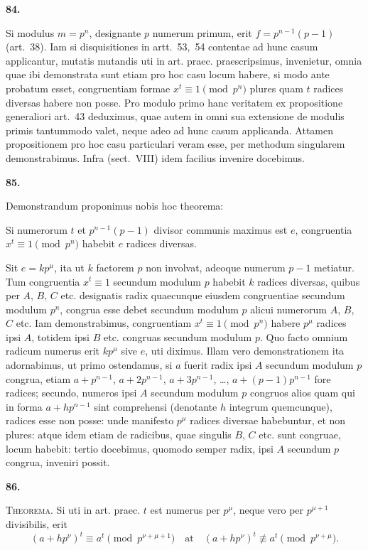 \documentclass[12pt,a4paper]{article}
\theoremstyle{plain}
\theoremstyle{definition}
\theoremstyle{remark}
\begin{document}
\setcounter{satz}{84}
\addtocounter{satz}{-1}
\textbf{84.}

Si modulus $m=p^n$, designante $p$ numerum primum, erit $f=p^{n-1}(p-1)$ (art.~38). Iam si disquisitiones in artt.~53,~54 contentae ad hunc casum applicantur, mutatis mutandis uti in art. praec. praescripsimus, invenietur, omnia quae ibi demonstrata sunt etiam pro hoc casu locum habere, si modo ante probatum esset, congruentiam formae $x^t \equiv 1 \pmod{p^n}$ plures quam $t$ radices diversas habere non posse. Pro modulo primo hanc veritatem ex propositione generaliori art.~43 deduximus, quae autem in omni sua extensione de modulis primis tantummodo valet, neque adeo ad hunc casum applicanda. Attamen propositionem pro hoc casu particulari veram esse, per methodum singularem demonstrabimus. Infra (sect.~VIII) idem facilius invenire docebimus.

\setcounter{satz}{85}
\addtocounter{satz}{-1}
\textbf{85.}

Demonstrandum proponimus nobis hoc theorema:

Si numerorum $t$ et $p^{n-1}(p-1)$ divisor communis maximus est $e$, congruentia $x^t \equiv 1 \pmod{p^n}$ habebit $e$ radices diversas.

Sit $e=kp^\mu$, ita ut $k$ factorem $p$ non involvat, adeoque numerum $p-1$ metiatur. Tum congruentia $x^t \equiv 1$ secundum modulum $p$ habebit $k$ radices diversas, quibus per $A$, $B$, $C$ etc. designatis radix quaecunque eiusdem congruentiae secundum modulum $p^n$, congrua esse debet secundum modulum $p$ alicui numerorum $A$, $B$, $C$ etc. Iam demonstrabimus, congruentiam $x^t \equiv 1 \pmod{p^n}$ habere $p^\mu$ radices ipsi $A$, totidem ipsi $B$ etc. congruas secundum modulum $p$. Quo facto omnium radicum numerus erit $kp^\mu$ sive $e$, uti diximus. Illam vero demonstrationem ita adornabimus, ut primo ostendamus, si $a$ fuerit radix ipsi $A$ secundum modulum $p$ congrua, etiam $a+p^{n-1}$, $a+2p^{n-1}$, $a+3p^{n-1}$, \ldots, $a+(p-1)p^{n-1}$ fore radices; secundo, numeros ipsi $A$ secundum modulum $p$ congruos alios quam qui in forma $a+hp^{n-1}$ sint comprehensi (denotante $h$ integrum quemcunque), radices esse non posse: unde manifesto $p^\mu$ radices diversae habebuntur, et non plures: atque idem etiam de radicibus, quae singulis $B$, $C$ etc. sunt congruae, locum habebit: tertio docebimus, quomodo semper radix, ipsi $A$ secundum $p$ congrua, inveniri possit.

\setcounter{satz}{86}
\addtocounter{satz}{-1}
\textbf{86.}

\textsc{Theorema.} Si uti in art. praec. $t$ est numerus per $p^\mu$, neque vero per $p^{\mu+1}$ divisibilis, erit
\[(a+hp^\nu)^t \equiv a^t \pmod{p^{\nu+\mu+1}}\quad\text{at}\quad (a+hp^\nu)^t \not\equiv a^t \pmod{p^{\nu+\mu}}.\]
\end{document}
